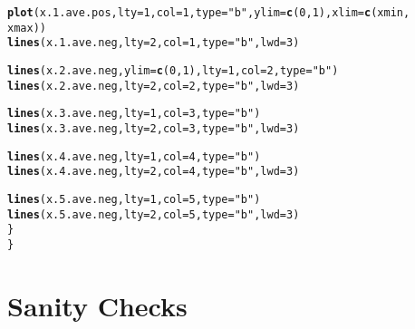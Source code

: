 \documentclass{article}\usepackage[]{graphicx}\usepackage[]{color}
\makeatletter
\newcommand{\hlnum}[1]{\textcolor[rgb]{0.686,0.059,0.569}{#1}}%
\newcommand{\hlstr}[1]{\textcolor[rgb]{0.192,0.494,0.8}{#1}}%
\newcommand{\hlstd}[1]{\textcolor[rgb]{0.345,0.345,0.345}{#1}}%
\newcommand{\hlkwc}[1]{\textcolor[rgb]{0.333,0.667,0.333}{#1}}%
\newcommand{\hlkwd}[1]{\textcolor[rgb]{0.737,0.353,0.396}{\textbf{#1}}}%
\newenvironment{kframe}{%
 \def\at@end@of@kframe{}%
 \ifinner\ifhmode%
  \def\at@end@of@kframe{\end{minipage}}%
  \begin{minipage}{\columnwidth}%
 \fi\fi%
 \def\FrameCommand##1{\hskip\@totalleftmargin \hskip-\fboxsep
 \colorbox{shadecolor}{##1}\hskip-\fboxsep
     \hskip-\linewidth \hskip-\@totalleftmargin \hskip\columnwidth}%
 \MakeFramed {\advance\hsize-\width
   \@totalleftmargin\z@ \linewidth\hsize
   \@setminipage}}%
 {\par\unskip\endMakeFramed%
 \at@end@of@kframe}
\newenvironment{knitrout}{}{} %
\makeatother
\begin{document}
\begin{knitrout}
\begin{kframe}
\begin{alltt}
        \hlkwd{plot}\hlstd{(x.1.ave.pos,} \hlkwc{lty} \hlstd{=} \hlnum{1}\hlstd{,} \hlkwc{col} \hlstd{=} \hlnum{1}\hlstd{,} \hlkwc{type} \hlstd{=} \hlstr{"b"}\hlstd{,} \hlkwc{ylim} \hlstd{=} \hlkwd{c}\hlstd{(}\hlnum{0}\hlstd{,} \hlnum{1}\hlstd{),} \hlkwc{xlim} \hlstd{=} \hlkwd{c}\hlstd{(xmin,}
            \hlstd{xmax))}
        \hlkwd{lines}\hlstd{(x.1.ave.neg,} \hlkwc{lty} \hlstd{=} \hlnum{2}\hlstd{,} \hlkwc{col} \hlstd{=} \hlnum{1}\hlstd{,} \hlkwc{type} \hlstd{=} \hlstr{"b"}\hlstd{,} \hlkwc{lwd} \hlstd{=} \hlnum{3}\hlstd{)}

        \hlkwd{lines}\hlstd{(x.2.ave.neg,} \hlkwc{ylim} \hlstd{=} \hlkwd{c}\hlstd{(}\hlnum{0}\hlstd{,} \hlnum{1}\hlstd{),} \hlkwc{lty} \hlstd{=} \hlnum{1}\hlstd{,} \hlkwc{col} \hlstd{=} \hlnum{2}\hlstd{,} \hlkwc{type} \hlstd{=} \hlstr{"b"}\hlstd{)}
        \hlkwd{lines}\hlstd{(x.2.ave.neg,} \hlkwc{lty} \hlstd{=} \hlnum{2}\hlstd{,} \hlkwc{col} \hlstd{=} \hlnum{2}\hlstd{,} \hlkwc{type} \hlstd{=} \hlstr{"b"}\hlstd{,} \hlkwc{lwd} \hlstd{=} \hlnum{3}\hlstd{)}

        \hlkwd{lines}\hlstd{(x.3.ave.neg,} \hlkwc{lty} \hlstd{=} \hlnum{1}\hlstd{,} \hlkwc{col} \hlstd{=} \hlnum{3}\hlstd{,} \hlkwc{type} \hlstd{=} \hlstr{"b"}\hlstd{)}
        \hlkwd{lines}\hlstd{(x.3.ave.neg,} \hlkwc{lty} \hlstd{=} \hlnum{2}\hlstd{,} \hlkwc{col} \hlstd{=} \hlnum{3}\hlstd{,} \hlkwc{type} \hlstd{=} \hlstr{"b"}\hlstd{,} \hlkwc{lwd} \hlstd{=} \hlnum{3}\hlstd{)}

        \hlkwd{lines}\hlstd{(x.4.ave.neg,} \hlkwc{lty} \hlstd{=} \hlnum{1}\hlstd{,} \hlkwc{col} \hlstd{=} \hlnum{4}\hlstd{,} \hlkwc{type} \hlstd{=} \hlstr{"b"}\hlstd{)}
        \hlkwd{lines}\hlstd{(x.4.ave.neg,} \hlkwc{lty} \hlstd{=} \hlnum{2}\hlstd{,} \hlkwc{col} \hlstd{=} \hlnum{4}\hlstd{,} \hlkwc{type} \hlstd{=} \hlstr{"b"}\hlstd{,} \hlkwc{lwd} \hlstd{=} \hlnum{3}\hlstd{)}

        \hlkwd{lines}\hlstd{(x.5.ave.neg,} \hlkwc{lty} \hlstd{=} \hlnum{1}\hlstd{,} \hlkwc{col} \hlstd{=} \hlnum{5}\hlstd{,} \hlkwc{type} \hlstd{=} \hlstr{"b"}\hlstd{)}
        \hlkwd{lines}\hlstd{(x.5.ave.neg,} \hlkwc{lty} \hlstd{=} \hlnum{2}\hlstd{,} \hlkwc{col} \hlstd{=} \hlnum{5}\hlstd{,} \hlkwc{type} \hlstd{=} \hlstr{"b"}\hlstd{,} \hlkwc{lwd} \hlstd{=} \hlnum{3}\hlstd{)}
    \hlstd{\}}
\hlstd{\}}
\end{alltt}
\end{kframe}
\end{knitrout}


\newpage

\section{Sanity Checks}
\label{sec:sanity-checks}
\end{document}
